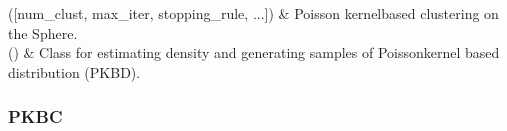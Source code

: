 \documentclass[letterpaper,10pt,english,openany,oneside]{sphinxmanual}
\begin{document}
\begin{savenotes}\sphinxattablestart
\sphinxthistablewithglobalstyle
\sphinxthistablewithnovlinesstyle
\centering
\begin{tabulary}{\linewidth}[t]{}
\sphinxtoprule
\sphinxtableatstartofbodyhook
\sphinxAtStartPar
{\hyperref[\detokenize{api_reference/generated/QuadratiK.spherical_clustering.PKBC:QuadratiK.spherical_clustering.PKBC}]{}}({[}num\_clust, max\_iter, stopping\_rule, ...{]})
&
\sphinxAtStartPar
Poisson kernel\sphinxhyphen{}based clustering on the Sphere.
\\
\sphinxhline
\sphinxAtStartPar
{\hyperref[\detokenize{api_reference/generated/QuadratiK.spherical_clustering.PKBD:QuadratiK.spherical_clustering.PKBD}]{}}()
&
\sphinxAtStartPar
Class for estimating density and generating samples of Poisson\sphinxhyphen{}kernel based distribution (PKBD).
\\
\sphinxbottomrule
\end{tabulary}
\sphinxtableafterendhook\par
\sphinxattableend\end{savenotes}

\sphinxstepscope


\subsubsection{PKBC}
\label{\detokenize{api_reference/generated/QuadratiK.spherical_clustering.PKBC:pkbc}}\label{\detokenize{api_reference/generated/QuadratiK.spherical_clustering.PKBC::doc}}
\end{document}
